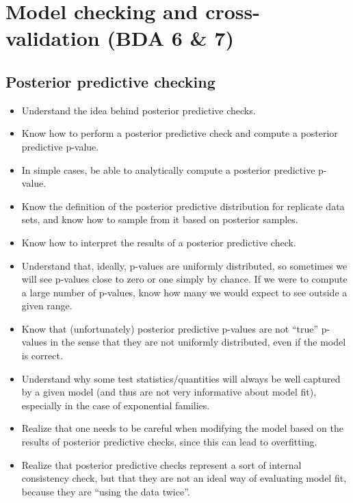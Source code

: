 \documentclass[12pt]{article}
\begin{document}
\section{Model checking and cross-validation (BDA 6 \& 7)}

\subsection{Posterior predictive checking}
\begin{itemize}
\item Understand the idea behind posterior predictive checks.
\item Know how to perform a posterior predictive check and compute a posterior predictive p-value.
\item In simple cases, be able to analytically compute a posterior predictive p-value.
\item Know the definition of the posterior predictive distribution for replicate data sets, and know how to sample from it based on posterior samples.
\item Know how to interpret the results of a posterior predictive check. 
\item Understand that, ideally, p-values are uniformly distributed, so sometimes we will see p-values close to zero or one simply by chance. If we were to compute a large number of p-values, know how many we would expect to see outside a given range.
\item Know that (unfortunately) posterior predictive p-values are not ``true'' p-values in the sense that they are not uniformly distributed, even if the model is correct.
\item Understand why some test statistics/quantities will always be well captured by a given model (and thus are not very informative about model fit), especially in the case of exponential families.
\item Realize that one needs to be careful when modifying the model based on the results of posterior predictive checks, since this can lead to overfitting.
\item Realize that posterior predictive checks represent a sort of internal consistency check, but that they are not an ideal way of evaluating model fit, because they are ``using the data twice''.
\end{itemize}
\end{document}
